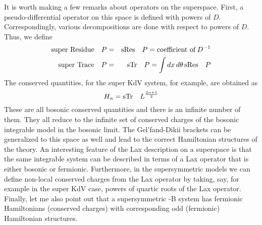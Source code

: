 \documentclass[a4paper,11pt]{article}
\begin{document}
It is worth making a few remarks about operators on the
superspace. First, a pseudo-differential operator on this space is
defined with powers of $D$. Correspondingly, various decompositions
are done with respect to powers of $D$. Thus, we define
\begin{eqnarray}
{\rm super\ Residue}\quad P & = & {\rm sRes}\quad P = {\rm
coefficient\ of}\,D^{-1}\nonumber\\
{\rm super\ Trace}\quad P & = & {\rm sTr}\quad P = \int dx\,d\theta\,
{\rm sRes}\quad P
\end{eqnarray}
The conserved quantities, for the super KdV system, for example, are
obtained as
\begin{equation}
H_{n} = {\rm sTr}\quad L^{2n+1\over 2}
\end{equation}
These are all bosonic conserved quantities and there is an infinite
number of them. They all reduce to the infinite set of 
conserved charges of the bosonic integrable model in the bosonic
limit. The Gel'fand-Dikii brackets can be generalized to this space as
well and lead to the correct Hamiltonian structures of the theory. An
interesting feature of the Lax description on a superspace is that the
same integrable system can be described in terms of a Lax operator
that is either bosonic or fermionic. Furthermore, in the
supersymmetric models we can define non-local conserved charges from
the Lax operator by taking, say, for example in the super KdV case,
powers of quartic roots of the Lax operator. Finally, let me also
point out that a supersymmetric -B system has fermionic Hamiltonians
(conserved charges) with corresponding odd (fermionic) Hamiltonian
structures.

\end{document}
